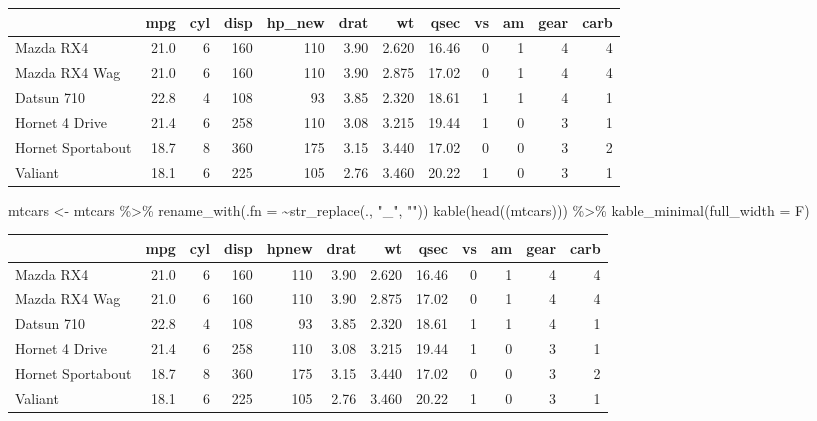 \documentclass[
]{article}
\newenvironment{Shaded}{\begin{snugshade}}{\end{snugshade}}
\newcommand{\AttributeTok}[1]{\textcolor[rgb]{0.77,0.63,0.00}{#1}}
\newcommand{\FunctionTok}[1]{\textcolor[rgb]{0.00,0.00,0.00}{#1}}
\newcommand{\NormalTok}[1]{#1}
\newcommand{\OtherTok}[1]{\textcolor[rgb]{0.56,0.35,0.01}{#1}}
\newcommand{\SpecialCharTok}[1]{\textcolor[rgb]{0.00,0.00,0.00}{#1}}
\newcommand{\StringTok}[1]{\textcolor[rgb]{0.31,0.60,0.02}{#1}}
\begin{document}
\begin{table}
\centering
\begin{tabular}{l|r|r|r|r|r|r|r|r|r|r|r}
\hline
  & mpg & cyl & disp & hp\_new & drat & wt & qsec & vs & am & gear & carb\\
\hline
Mazda RX4 & 21.0 & 6 & 160 & 110 & 3.90 & 2.620 & 16.46 & 0 & 1 & 4 & 4\\
\hline
Mazda RX4 Wag & 21.0 & 6 & 160 & 110 & 3.90 & 2.875 & 17.02 & 0 & 1 & 4 & 4\\
\hline
Datsun 710 & 22.8 & 4 & 108 & 93 & 3.85 & 2.320 & 18.61 & 1 & 1 & 4 & 1\\
\hline
Hornet 4 Drive & 21.4 & 6 & 258 & 110 & 3.08 & 3.215 & 19.44 & 1 & 0 & 3 & 1\\
\hline
Hornet Sportabout & 18.7 & 8 & 360 & 175 & 3.15 & 3.440 & 17.02 & 0 & 0 & 3 & 2\\
\hline
Valiant & 18.1 & 6 & 225 & 105 & 2.76 & 3.460 & 20.22 & 1 & 0 & 3 & 1\\
\hline
\end{tabular}
\end{table}

\begin{Shaded}
\begin{Highlighting}[]
\NormalTok{mtcars }\OtherTok{\textless{}{-}}\NormalTok{ mtcars }\SpecialCharTok{\%\textgreater{}\%} \FunctionTok{rename\_with}\NormalTok{(}\AttributeTok{.fn =} \SpecialCharTok{\textasciitilde{}}\FunctionTok{str\_replace}\NormalTok{(., }\StringTok{"\_"}\NormalTok{, }\StringTok{""}\NormalTok{))}
\FunctionTok{kable}\NormalTok{(}\FunctionTok{head}\NormalTok{((mtcars))) }\SpecialCharTok{\%\textgreater{}\%} \FunctionTok{kable\_minimal}\NormalTok{(}\AttributeTok{full\_width =}\NormalTok{ F)}
\end{Highlighting}
\end{Shaded}

\begin{table}
\centering
\begin{tabular}{l|r|r|r|r|r|r|r|r|r|r|r}
\hline
  & mpg & cyl & disp & hpnew & drat & wt & qsec & vs & am & gear & carb\\
\hline
Mazda RX4 & 21.0 & 6 & 160 & 110 & 3.90 & 2.620 & 16.46 & 0 & 1 & 4 & 4\\
\hline
Mazda RX4 Wag & 21.0 & 6 & 160 & 110 & 3.90 & 2.875 & 17.02 & 0 & 1 & 4 & 4\\
\hline
Datsun 710 & 22.8 & 4 & 108 & 93 & 3.85 & 2.320 & 18.61 & 1 & 1 & 4 & 1\\
\hline
Hornet 4 Drive & 21.4 & 6 & 258 & 110 & 3.08 & 3.215 & 19.44 & 1 & 0 & 3 & 1\\
\hline
Hornet Sportabout & 18.7 & 8 & 360 & 175 & 3.15 & 3.440 & 17.02 & 0 & 0 & 3 & 2\\
\hline
Valiant & 18.1 & 6 & 225 & 105 & 2.76 & 3.460 & 20.22 & 1 & 0 & 3 & 1\\
\hline
\end{tabular}
\end{table}
\end{document}
